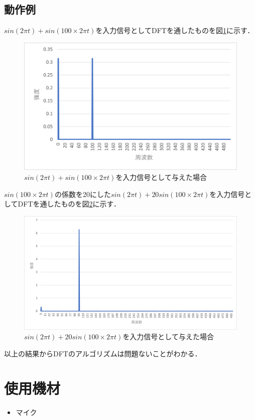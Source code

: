 \documentclass[titlepage]{jarticle}
\begin{document}
\subsection{動作例}
$sin( 2 \pi t)+sin(100 \times 2 \pi t)$を入力信号としてDFTを通したものを図\ref{1_100}に示す．
\begin{figure}[H]
  \centering
  \includegraphics[width=0.6\hsize]{img/1_100.png}
  \caption{$sin(2 \pi t)+sin(100 \times 2 \pi t)$を入力信号として与えた場合}
  \label{1_100}
\end{figure}

$sin(100 \times 2 \pi t)$の係数を20にした$sin(2 \pi t)+20sin(100 \times 2 \pi t)$を入力信号としてDFTを通したものを図\ref{1_20-100}に示す．
\begin{figure}[H]
  \centering
  \includegraphics[width=0.6\hsize]{img/1_20-100.png}
  \caption{$sin( 2 \pi t)+20sin(100 \times 2 \pi t)$を入力信号として与えた場合}
  \label{1_20-100}
\end{figure}
以上の結果からDFTのアルゴリズムは問題ないことがわかる．

\section{使用機材}
\begin{itemize}
  \item マイク
\end{itemize}
\end{document}
